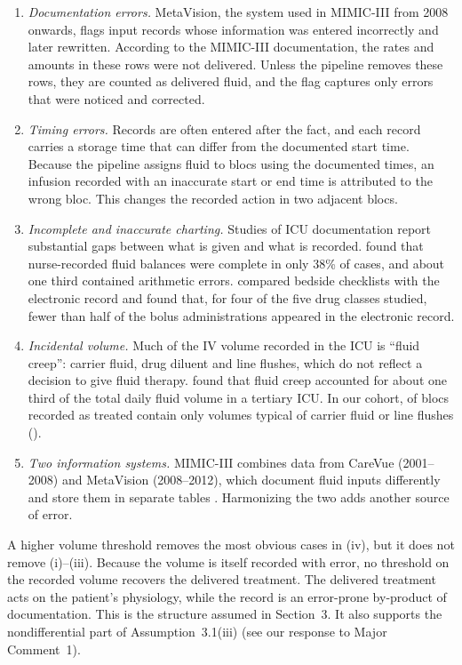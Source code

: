\documentclass[12pt]{article}
\newcommand{\res}[1]{{\color{red}{#1}}}
\newcommand{\0}{\boldsymbol{0}}
\theoremstyle{definition}
\begin{document}
\begin{enumerate}[label=(\roman*)]
    \item \textit{Documentation errors.} MetaVision, the system used in MIMIC-III from 2008 onwards, flags input records whose information was entered incorrectly and later rewritten. According to the MIMIC-III documentation, the rates and amounts in these rows were not delivered. Unless the pipeline removes these rows, they are counted as delivered fluid, and the flag captures only errors that were noticed and corrected.
    \item \textit{Timing errors.} Records are often entered after the fact, and each record carries a storage time that can differ from the documented start time. Because the pipeline assigns fluid to blocs using the documented times, an infusion recorded with an inaccurate start or end time is attributed to the wrong bloc. This changes the recorded action in two adjacent blocs.
    \item \textit{Incomplete and inaccurate charting.} Studies of ICU documentation report substantial gaps between what is given and what is recorded. \citet{perren2011fluid} found that nurse-recorded fluid balances were complete in only 38\% of cases, and about one third contained arithmetic errors. \citet{raimann2024mind} compared bedside checklists with the electronic record and found that, for four of the five drug classes studied, fewer than half of the bolus administrations appeared in the electronic record.
    \item \textit{Incidental volume.} Much of the IV volume recorded in the ICU is ``fluid creep'': carrier fluid, drug diluent and line flushes, which do not reflect a decision to give fluid therapy. \citet{vanregenmortel2018maintenance} found that fluid creep accounted for about one third of the total daily fluid volume in a tertiary ICU. In our cohort, \res{about 19\%} of blocs recorded as treated contain only volumes typical of carrier fluid or line flushes (\res{at most 45 mL per 4 hours}).
    \item \textit{Two information systems.} MIMIC-III combines data from CareVue (2001--2008) and MetaVision (2008--2012), which document fluid inputs differently and store them in separate tables \citep{johnson2016mimic}. Harmonizing the two adds another source of error.
\end{enumerate}
A higher volume threshold removes the most obvious cases in (iv), but it does not remove (i)--(iii). Because the volume is itself recorded with error, no threshold on the recorded volume recovers the delivered treatment. The delivered treatment acts on the patient's physiology, while the record is an error-prone by-product of documentation. This is the structure assumed in Section~3. It also supports the nondifferential part of Assumption~3.1(iii) (see our response to Major Comment~1).
\end{document}
